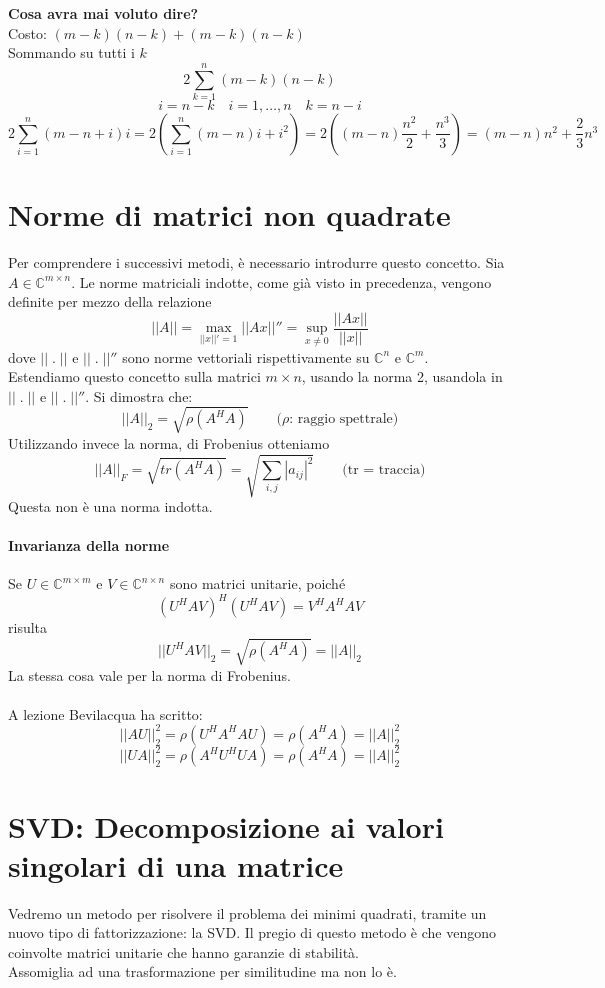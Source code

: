 \begin{workinprogress} \textbf{Cosa avra mai voluto dire?} \\ Costo:
$(m-k) (n-k) + (m-k)(n-k)$ \\ Sommando su tutti i $k$
$$
\displaystyle 2 \sum_{k=1}^{n} (m-k)(n-k)
$$
$$i =n-k \quad i =1, \ldots, n \quad k = n-i$$
$$ 
2 \displaystyle \sum_{i=1}^{n} (m-n+i)i = 2 (\displaystyle
\sum_{i=1}^{n} (m-n) i + \displaystyle i^{2}) = 2 (( m-n)
\frac{n^{2}}{2} + \frac{n^3}{3}) = (m-n)n^{2} + \frac{2}{3}n^{3}
$$   
\end{workinprogress}

\section{Norme di matrici non quadrate} Per comprendere i successivi
metodi, \`e necessario introdurre questo concetto.  Sia $A \in
\mathbb{C}^{m\times n}$. Le norme matriciali indotte, come gi\`a visto
in precedenza, vengono definite per mezzo della relazione
$$ || A|| = \max_{||x||' = 1} ||Ax ||'' = \sup_{x \neq 0}
\frac{||Ax||}{||x||}
$$
dove $|| \; . \; ||$ e $|| \; . \; ||''$ sono norme vettoriali
rispettivamente su $\mathbb{C}^{n}$ e $\mathbb{C}^{m}$. \\ Estendiamo
questo concetto sulla matrici $m \times n$, usando la norma 2,
usandola in $|| \; . \; ||$ e $|| \; . \; ||''$.  Si dimostra che:
$$ || A||_{2} = \sqrt{\rho(A^{H}A)}
\qquad \text{($\rho$: raggio spettrale)}
$$
Utilizzando invece la norma, di Frobenius otteniamo
$$ ||A||_{F} = \sqrt{tr(A^{H}A)} =
\sqrt{\displaystyle \sum_{i,j}|a_{ij}|^{2} } \qquad \text{(tr =
traccia)}
$$ 
Questa non è una norma indotta.

\paragraph{Invarianza della norme} Se $U \in \mathbb{C}^{m \times m}$
e $V \in \mathbb{C}^{n\times n}$ sono matrici unitarie, poiché
$$ (U^{H}AV)^{H}(U^{H}AV) = V^{H}A^{H}AV$$
risulta
$$|| U^{H}AV||_{2} = \sqrt{\rho(A^{H}A)} = ||A||_{2}$$
La stessa cosa vale per la norma di Frobenius. \\ \\ A lezione
Bevilacqua ha scritto:
$$ || AU||_{2}^{2} = \rho (U^{H} A^{H}A U)
= \rho(A^{H}A) = ||A||_{2}^{2}
$$
$$ ||UA ||_{2}^{2} = \rho(A^{H} U^{H}UA)
= \rho(A^{H}A) = ||A||_{2}^{2}$$

\section{SVD: Decomposizione ai valori singolari di una matrice }
Vedremo un metodo per risolvere il problema dei minimi quadrati,
tramite un nuovo tipo di fattorizzazione: la SVD.  Il pregio di questo
metodo \`e che vengono coinvolte matrici unitarie che hanno garanzie di
stabilità. \\ 
Assomiglia ad una trasformazione per similitudine ma non lo \`e.

